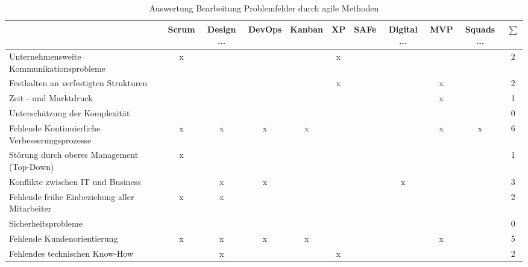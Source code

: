 \begin{table}
	\centering
	\caption{Auswertung Bearbeitung Problemfelder durch agile Methoden}
	\begin{tabular}{|p{7cm}|c|c|c|c|c|c|c|c|c|c|}
		\hline
		& Scrum & Design ...  & DevOps & Kanban & XP & SAFe & Digital ... & MVP & Squads ... & $\sum$ \\
		\hline
		Unternehmensweite Kommunikationsprobleme        & x     &                 &        &        & x  &      &                        &     &                   & 2 \\
		Festhalten an verfestigten Strukturen           &       &                 &        &        & x  &      &                        & x   &                   & 2 \\
		Zeit - und Marktdruck                           &       &                 &        &        &    &      &                        & x   &                   & 1 \\
		Unterschätzung der Komplexität                  &       &                 &        &        &    &      &                        &     &                   & 0 \\
		Fehlende Kontinuierliche Verbesserungsprozesse  & x     & x               & x      & x      &    &      &                        & x   & x                 & 6 \\
		Störung durch oberes Management (Top-Down)      & x     &                 &        &        &    &      &                        &     &                   & 1 \\
		Konflikte zwischen IT und Business              &       & x               & x      &        &    &      & x                      &     &                   & 3 \\
		Fehlende frühe Einbeziehung aller Mitarbeiter   & x     & x               &        &        &    &      &                        &     &                   & 2 \\
		Sicherheitsprobleme                             &       &                 &        &        &    &      &                        &     &                   & 0 \\
		Fehlende Kundenorientierung                     & x     & x               & x      & x      &    &      &                        & x   &                   & 5 \\
		Fehlendes technischen Know-How                  &       & x               &        &        & x  &      &                        &     &                   & 2 \\

\end{tabular}
\end{table}
